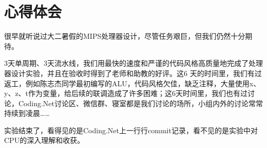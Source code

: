 \documentclass{article}
\begin{document}
    \section{心得体会}
        很早就听说过大二暑假的MIPS处理器设计，尽管任务艰巨，但我们仍然十分期待。
        
        3天单周期、3天流水线，我们用最快的速度和严谨的代码风格高质量地完成了处理器设计实验，并且在验收时得到了老师和助教的好评。这6 天的时间里，我们有过返工，例如陈志杰同学最初编写的ALU，代码风格欠佳，缺乏注释，大量使用x、y、z、t作为变量，给后续的联调造成了许多困难；这6天时间里，我们也有过讨论，Coding.Net讨论区、微信群、寝室都是我们讨论的场所，小组内外的讨论常常持续到凌晨……
        
        实验结束了，看得见的是Coding.Net上一行行commit记录，看不见的是实验中对CPU的深入理解和收获。
\end{document}
